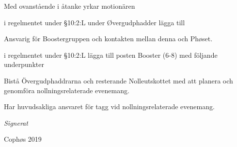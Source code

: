 \documentclass[../_main/handlingar.tex]{subfiles}
\begin{document}
Med ovanstående i åtanke yrkar motionären

\begin{attsatser}

    \att i regelmentet under \S10:2:L under  Øvergudphadder lägga till \par

    \begin{dashlist}
        \item Ansvarig för Boostergruppen och kontakten mellan denna och Phøset.
    \end{dashlist}

    \att i regelmentet under \S10:2:L lägga till posten Booster (6-8) med följande underpunkter   
    \begin{dashlist}
        \item Bistå Övergudphaddrarna och resterande Nolleutskottet med att planera och genomföra
        nollningsrelaterade evenemang.
        \item Har huvudsakliga ansvaret för tagg vid nollningsrelaterade evenemang.
    \end{dashlist}

\end{attsatser}


\begin{signatures}{1}
    \textit{Signerat}
    \signature{Tove Börjeson}{Cophøs 2019}
\end{signatures}
\end{document}
